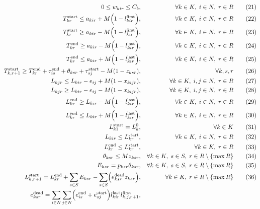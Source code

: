 \documentclass[11pt]{article}
\begin{document}
\begin{align}
0\le w_{kir} \le C_b,
&& \forall k\in K,\; i\in N,\; r\in R
\tag{21} \\
T^{\mathrm{start}}_{kr}\le a_{kir} + M\Bigl(1-l^{\text{first}}_{kir}\Bigr),
&& \forall k\in K,\; i\in N,\; r\in R
\tag{22}\\
T^{\mathrm{start}}_{kr}\ge a_{kir} - M\Bigl(1-l^{\text{first}}_{kir}\Bigr),
&& \forall k\in K,\; i\in N,\; r\in R
\tag{23}\\
T^{\mathrm{end}}_{kr}\ge a_{kir} - M\Bigl(1-l^{\text{last}}_{kir}\Bigr),
&& \forall k\in K,\; i\in N,\; r\in R
\tag{24}\\
T^{\mathrm{end}}_{kr}\le a_{kir} + M\Bigl(1-l^{\text{last}}_{kir}\Bigr),
&& \forall k\in K,\; i\in N,\; r\in R
\tag{25}\\
T^{\mathrm{start}}_{k,r+1}\ge T^{\mathrm{end}}_{kr}
+ \tau^{\mathrm{end}}_{i s}
+ \theta_{ksr}
+ \tau^{\mathrm{start}}_{s j}
- M(1-z_{ksr}),
&& \forall k,s,r
\tag{26} \\
L_{kjr}\le L_{kir} - e_{ij} + M(1-x_{kijr}),
&& \forall k\in K,\; i,j\in N,\; r\in R
\tag{27} \\
L_{kjr}\ge L_{kir} - e_{ij} - M(1-x_{kijr}),
&& \forall k\in K,\; i,j\in N,\; r\in R
\tag{28} \\
L^{\mathrm{end}}_{kr}\ge L_{kir} - M\Bigl(1-l^{\text{last}}_{kir}\Bigr),
&& \forall k\in K,\; i\in N,\; r\in R
\tag{29} \\
L^{\mathrm{end}}_{kr}\le L_{kir} + M\Bigl(1-l^{\text{last}}_{kir}\Bigr),
&& \forall k\in K,\; i\in N,\; r\in R
\tag{30} \\
L^{\mathrm{start}}_{k1}= L_k^0,
&& \forall k\in K
\tag{31} \\
L_{kir}\le L^{\mathrm{start}}_{kr},
&& \forall k\in K,\; i\in N,\; r\in R
\tag{32} \\
L^{\mathrm{end}}_{kr}\le L^{\mathrm{start}}_{kr},
&& \forall k\in K,\; r\in R
\tag{33} \\
\theta_{ksr}\le M z_{ksr},
&& \forall k\in K,\; s\in S,\; r\in R\setminus\{\max R\}
\tag{34}\\
E_{ksr}= p_{ksr}\theta_{ksr},
&& \forall k\in K,\; s\in S,\; r\in R\setminus\{\max R\}
\tag{35} \\
L^{\mathrm{start}}_{k,r+1}=
L^{\mathrm{end}}_{kr}
+ \sum_{s\in S} E_{ksr}
- \sum_{s\in S} \Bigl(e^{\mathrm{dead}}_{ksr} z_{ksr}\Bigr),
&& \forall k\in K,\; r\in R\setminus\{\max R\}
\tag{36} \\
e^{\mathrm{dead}}_{ksr}= \sum_{i\in N}\sum_{j\in N} \Bigl(e^{\text{end}}_{is} + e^{\text{start}}_{sj}\Bigr) l^{\text{last}}_{kir} l^{\text{first}}_{k,j,r+1},

\end{align}
\end{document}
